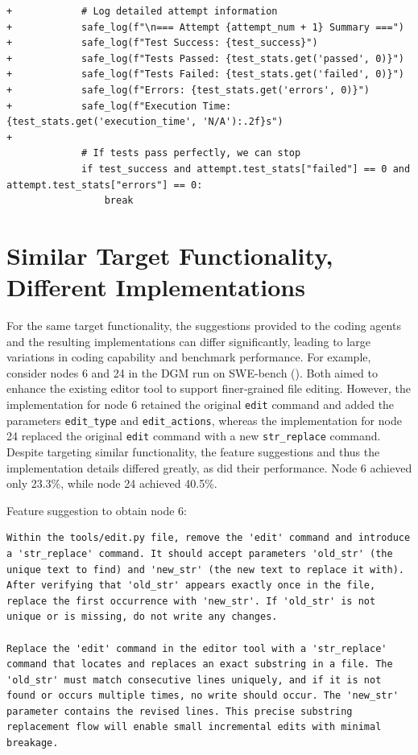 \documentclass{article}
\begin{document}
\begin{lstlisting}[style=diffstyle]
+            # Log detailed attempt information
+            safe_log(f"\n=== Attempt {attempt_num + 1} Summary ===")
+            safe_log(f"Test Success: {test_success}")
+            safe_log(f"Tests Passed: {test_stats.get('passed', 0)}")
+            safe_log(f"Tests Failed: {test_stats.get('failed', 0)}")
+            safe_log(f"Errors: {test_stats.get('errors', 0)}")
+            safe_log(f"Execution Time: {test_stats.get('execution_time', 'N/A'):.2f}s")
+            
             # If tests pass perfectly, we can stop
             if test_success and attempt.test_stats["failed"] == 0 and attempt.test_stats["errors"] == 0:
                 break
\end{lstlisting}


\section{Similar Target Functionality, Different Implementations}
\label{app:supp-dgm-diffimpl}
For the same target functionality, the suggestions provided to the coding agents and the resulting implementations can differ significantly, leading to large variations in coding capability and benchmark performance. For example, consider nodes 6 and 24 in the DGM run on SWE-bench (). Both aimed to enhance the existing editor tool to support finer‑grained file editing. However, the implementation for node 6 retained the original \texttt{edit} command and added the parameters \texttt{edit\_type} and \texttt{edit\_actions}, whereas the implementation for node 24 replaced the original \texttt{edit} command with a new \texttt{str\_replace} command. Despite targeting similar functionality, the feature suggestions and thus the implementation details differed greatly, as did their performance. Node 6 achieved only 23.3\%, while node 24 achieved 40.5\%.

Feature suggestion to obtain node 6:

\begin{lstlisting}
Within the tools/edit.py file, remove the 'edit' command and introduce a 'str_replace' command. It should accept parameters 'old_str' (the unique text to find) and 'new_str' (the new text to replace it with). After verifying that 'old_str' appears exactly once in the file, replace the first occurrence with 'new_str'. If 'old_str' is not unique or is missing, do not write any changes.

Replace the 'edit' command in the editor tool with a 'str_replace' command that locates and replaces an exact substring in a file. The 'old_str' must match consecutive lines uniquely, and if it is not found or occurs multiple times, no write should occur. The 'new_str' parameter contains the revised lines. This precise substring replacement flow will enable small incremental edits with minimal breakage.
\end{lstlisting}
\end{document}
